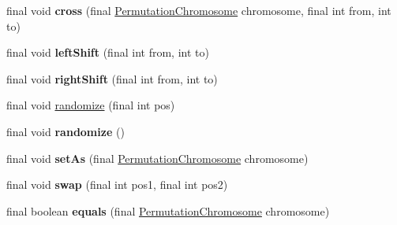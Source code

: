 \begin{CompactItemize}
\item 
\hypertarget{classjenes_1_1chromosome_1_1_permutation_chromosome_19caa5ba36809bcbca85c990741731cb}{
final void \textbf{cross} (final \hyperlink{classjenes_1_1chromosome_1_1_permutation_chromosome}{PermutationChromosome} chromosome, final int from, int to)}
\label{classjenes_1_1chromosome_1_1_permutation_chromosome_19caa5ba36809bcbca85c990741731cb}

\item 
\hypertarget{classjenes_1_1chromosome_1_1_permutation_chromosome_722e6ef2208337802c0a229b77a56629}{
final void \textbf{leftShift} (final int from, int to)}
\label{classjenes_1_1chromosome_1_1_permutation_chromosome_722e6ef2208337802c0a229b77a56629}

\item 
\hypertarget{classjenes_1_1chromosome_1_1_permutation_chromosome_fc488bdb0b77b15da659cde89a4e08b7}{
final void \textbf{rightShift} (final int from, int to)}
\label{classjenes_1_1chromosome_1_1_permutation_chromosome_fc488bdb0b77b15da659cde89a4e08b7}

\item 
final void \hyperlink{classjenes_1_1chromosome_1_1_permutation_chromosome_ea4acb031fb2b00f579be5c448825c47}{randomize} (final int pos)
\item 
\hypertarget{classjenes_1_1chromosome_1_1_permutation_chromosome_f1bec1fbdb637818dd33fbbe3c43d07f}{
final void \textbf{randomize} ()}
\label{classjenes_1_1chromosome_1_1_permutation_chromosome_f1bec1fbdb637818dd33fbbe3c43d07f}

\item 
\hypertarget{classjenes_1_1chromosome_1_1_permutation_chromosome_d1e5735c594b7c43f7cca5996da5741e}{
final void \textbf{setAs} (final \hyperlink{classjenes_1_1chromosome_1_1_permutation_chromosome}{PermutationChromosome} chromosome)}
\label{classjenes_1_1chromosome_1_1_permutation_chromosome_d1e5735c594b7c43f7cca5996da5741e}

\item 
\hypertarget{classjenes_1_1chromosome_1_1_permutation_chromosome_9dbfb8b76280184a204e89f737740f8f}{
final void \textbf{swap} (final int pos1, final int pos2)}
\label{classjenes_1_1chromosome_1_1_permutation_chromosome_9dbfb8b76280184a204e89f737740f8f}

\item 
\hypertarget{classjenes_1_1chromosome_1_1_permutation_chromosome_2cac25997ad82e5f3793bd65c8de1b37}{
final boolean \textbf{equals} (final \hyperlink{classjenes_1_1chromosome_1_1_permutation_chromosome}{PermutationChromosome} chromosome)}
\label{classjenes_1_1chromosome_1_1_permutation_chromosome_2cac25997ad82e5f3793bd65c8de1b37}


\end{CompactItemize}
